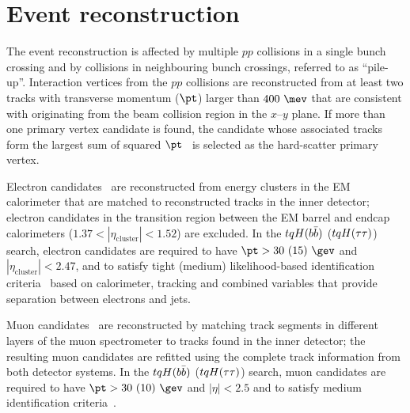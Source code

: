 
\section{Event reconstruction}
\label{sec:objects}

The event reconstruction is affected by multiple $pp$ collisions in a single bunch crossing and by collisions
in neighbouring bunch crossings, referred to as ``pile-up''. 
Interaction vertices from the $pp$ collisions are reconstructed from at least two tracks 
with transverse momentum ($\pt$) larger than $400~\mev$ that are consistent with originating from the 
beam collision region in the $x$--$y$ plane. If more than one primary vertex candidate is found, the
candidate whose associated tracks form the largest sum of squared $\pt$~\cite{ATL-PHYS-PUB-2015-026}
is selected as the hard-scatter primary vertex.

Electron candidates~\cite{ATLAS-CONF-2016-024,ATL-PHYS-PUB-2016-015} are reconstructed from energy 
clusters in the EM calorimeter that are matched to reconstructed tracks in the inner detector;
electron candidates in the transition region between the EM barrel and endcap calorimeters 
($1.37 < |\eta_{\textrm{cluster}}| < 1.52$) are excluded.
In the $tqH(b\bar{b})$ ($tqH(\tau\tau)$) search, electron candidates are required to have $\pt>30~(15)~\gev$ and 
$|\eta_{\textrm{cluster}}| < 2.47$, and to satisfy tight (medium) likelihood-based identification 
criteria~\cite{ATLAS-CONF-2016-024} based on calorimeter, tracking and combined variables that provide 
separation between electrons and jets. 

Muon candidates~\cite{Aad:2016jkr} are reconstructed by matching track segments in %
different layers of the muon spectrometer to tracks found in the inner detector;
the resulting muon candidates are refitted using the complete track information from both detector systems.
In the $tqH(b\bar{b})$ ($tqH(\tau\tau)$) search, muon candidates are required to have $\pt>30~(10)~\gev$ and $|\eta|<2.5$ 
and to satisfy medium identification criteria~\cite{Aad:2016jkr}. 

